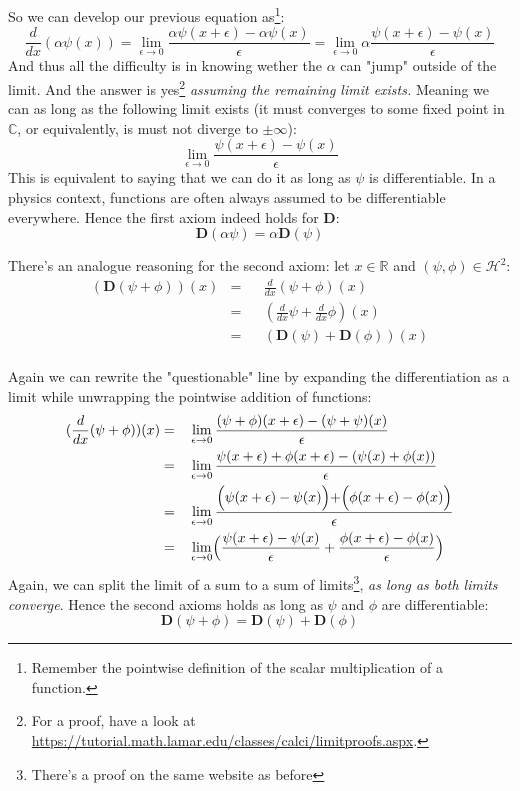 \documentclass[solutions.tex]{subfiles}
\begin{document}
So we can develop our previous equation as\footnote{Remember the
pointwise definition of the scalar multiplication of a function.}:
\[
	\frac{d}{dx}(\alpha\psi(x)) = \lim_{\epsilon\rightarrow 0}
	\frac{\alpha\psi(x+\epsilon)-\alpha\psi(x)}{\epsilon} =
	\lim_{\epsilon\rightarrow 0}
	\alpha\frac{\psi(x+\epsilon)-\psi(x)}{\epsilon}
\]
And thus all the difficulty is in knowing wether the $\alpha$ can
"jump" outside of the limit. And the answer is yes\footnote{For a proof, have a look
at \url{https://tutorial.math.lamar.edu/classes/calci/limitproofs.aspx}.}
\textit{assuming the remaining limit exists.} Meaning we can as long as the
following limit exists (it must converges to some fixed point in $\mathbb{C}$,
or equivalently, is must not diverge to $\pm\infty$):
\[
	\lim_{\epsilon\rightarrow 0}
	\frac{\psi(x+\epsilon)-\psi(x)}{\epsilon}
\]
This is equivalent to saying that we can do it as long as $\psi$ is differentiable.
In a physics context, functions are often always assumed to be differentiable
everywhere. Hence the first axiom indeed holds
for $\bm{D}$:
\[
	\boxed{\bm{D}(\alpha\psi) = \alpha\bm{D}(\psi)}
\]

There's an analogue reasoning for the second axiom: let $x\in\mathbb{R}$ and
$(\psi,\phi)\in\mathcal{H}^2$:
\begin{equation*}\begin{aligned}
	(\bm{D}(\psi+\phi))(x) &=&& \frac{d}{dx}(\psi+\phi)(x) \\
	~ &=&& (\frac{d}{dx}\psi+ \frac{d}{dx}\phi)(x) \\
	~ &=&& (\bm{D}(\psi) + \bm{D}(\phi))(x) \\
\end{aligned}\end{equation*}

Again we can rewrite the "questionable" line by expanding
the differentiation as a limit while unwrapping the
pointwise addition of functions:
\begin{equation*}\begin{aligned}
	(\frac{d}{dx}(\psi+\phi))(x) &=&& \lim_{\epsilon\rightarrow 0}
	\frac{(\psi+\phi)(x+\epsilon)-(\psi+\psi)(x)}{\epsilon} \\
	~ &=&& \lim_{\epsilon\rightarrow 0}
	\frac{\psi(x+\epsilon)+\phi(x+\epsilon)-(\psi(x)+\phi(x))}{\epsilon} \\
	~ &=&& \lim_{\epsilon\rightarrow 0}
	\frac{\Bigl(\psi(x+\epsilon)-\psi(x)\Bigr)+\Bigr(\phi(x+\epsilon)-\phi(x)\Bigl)}{\epsilon} \\
	~ &=&& \lim_{\epsilon\rightarrow 0}\Bigl(
	\frac{\psi(x+\epsilon)-\psi(x)}{\epsilon}
	+\frac{\phi(x+\epsilon)-\phi(x)}{\epsilon}\Bigr) \\
\end{aligned}\end{equation*}
Again, we can split the limit of a sum to a sum of limits\footnote{There's a proof on the
same website as before}, \textit{as long as both limits converge}. Hence
the second axioms holds as long as $\psi$ and $\phi$ are differentiable:
\[
	\boxed{\bm{D}(\psi+\phi) = \bm{D}(\psi) + \bm{D}(\phi)}
\]
\end{document}
